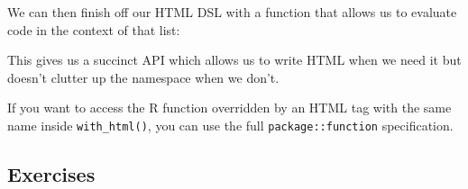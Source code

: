 We can then finish off our HTML DSL with a function that allows us to
evaluate code in the context of that list:

\begin{Shaded}
\begin{Highlighting}[]
\StringTok{ }
  \NormalTok{(}
\NormalTok{\}}
\end{Highlighting}
\end{Shaded}

This gives us a succinct API which allows us to write HTML when we need
it but doesn't clutter up the namespace when we don't.

\begin{Shaded}
\begin{Highlighting}[]
\NormalTok{(}\NormalTok{(}
  \NormalTok{(}\NormalTok{, } \NormalTok{),}
  \NormalTok{(}\NormalTok{, }\NormalTok{(}\NormalTok{)),}
  \NormalTok{(} \NormalTok{, } \NormalTok{, } \NormalTok{)}
\NormalTok{))}
\end{Highlighting}
\end{Shaded}

If you want to access the R function overridden by an HTML tag with the
same name inside \texttt{with\_html()}, you can use the full
\texttt{package::function} specification.

\subsection{Exercises}

